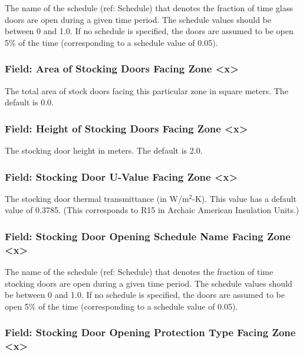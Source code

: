 The name of the schedule (ref: Schedule) that denotes the fraction of time glass doors are open during a given time period. The schedule values should be between 0 and 1.0. If no schedule is specified, the doors are assumed to be open 5\% of the time (corresponding to a schedule value of 0.05).

\subsubsection{Field: Area of Stocking Doors Facing Zone \textless{}x\textgreater{}}\label{field-area-of-stocking-doors-facing-zone-x}

The total area of stock doors facing this particular zone in square meters. The default is 0.0.

\subsubsection{Field: Height of Stocking Doors Facing Zone \textless{}x\textgreater{}}\label{field-height-of-stocking-doors-facing-zone-x}

The stocking door height in meters. The default is 2.0.

\subsubsection{Field: Stocking Door U-Value Facing Zone \textless{}x\textgreater{}}\label{field-stocking-door-u-value-facing-zone-x}

The stocking door thermal transmittance (in W/m\(^{2}\)-K). This value has a default value of 0.3785. (This corresponds to R15 in Archaic American Insulation Units.)

\subsubsection{Field: Stocking Door Opening Schedule Name Facing Zone \textless{}x\textgreater{}}\label{field-stocking-door-opening-schedule-name-facing-zone-x}

The name of the schedule (ref: Schedule) that denotes the fraction of time stocking doors are open during a given time period. The schedule values should be between 0 and 1.0. If no schedule is specified, the doors are assumed to be open 5\% of the time (corresponding to a schedule value of 0.05).

\subsubsection{Field: Stocking Door Opening Protection Type Facing Zone \textless{}x\textgreater{}}\label{field-stocking-door-opening-protection-type-facing-zone-x}


